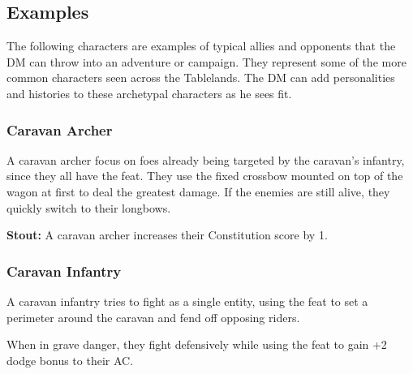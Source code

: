 \subsection{Examples}
The following characters are examples of typical allies and opponents that the DM can throw into an adventure or campaign. They represent some of the more common characters seen across the Tablelands. The DM can add personalities and histories to these archetypal characters as he sees fit.

\subsubsection{Caravan Archer}

A caravan archer focus on foes already being targeted by the caravan's infantry, since they all have the  feat. They use the fixed crossbow mounted on top of the wagon at first to deal the greatest damage. If the enemies are still alive, they quickly switch to their longbows.

\textbf{Stout:} A caravan archer increases their Constitution score by 1.

\subsubsection{Caravan Infantry}

A caravan infantry tries to fight as a single entity, using the  feat to set a perimeter around the caravan and fend off opposing riders.

When in grave danger, they fight defensively while using the  feat to gain +2 dodge bonus to their AC.

